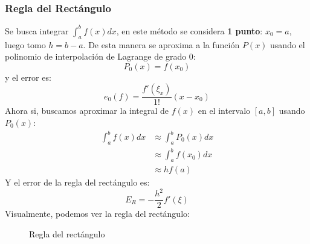 \documentclass{article}
\begin{document}
\subsubsection{Regla del Rectángulo}
Se busca integrar $\int_{a}^{b} f(x) dx$, en este método se considera \textbf{1 punto}: $x_0=a$, luego tomo $h=b-a$. De esta manera se aproxima a la función $P(x)$ usando el polinomio de interpolación de Lagrange de grado 0: 
\begin{equation}
    P_0(x) = f(x_0)
\end{equation}
y el error es:
\begin{equation}
    e_0(f) = \frac{f'(\xi_x)}{1!} (x-x_0)
\end{equation}
Ahora si, buscamos aproximar la integral de $f(x)$ en el intervalo $[a,b]$ usando $P_0(x)$:
\begin{align}
    \int_{a}^{b} f(x) dx &\approx \int_{a}^{b} P_0(x) dx \\
    &\approx \int_{a}^{b} f(x_0) dx \\
    &\approx h f(a)
\end{align}
Y el error de la regla del rectángulo es:
\begin{equation}
    E_R = -\frac{h^2}{2} f'(\xi)
\end{equation}
Visualmente, podemos ver la regla del rectángulo:
\begin{figure}[h]
    \centering
    \caption{Regla del rectángulo}
    \label{fig:myplot16}
\end{figure}
\newpage
\end{document}
